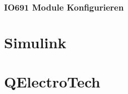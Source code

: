 \subsubsection{IO691 Module Konfigurieren}
\label{Simulink:IO691_Konfigurieren}


\newpage
\section{Simulink}
\label{section:Simulink}




\newpage
\section{QElectroTech}
\label{section:QElectroTech}




